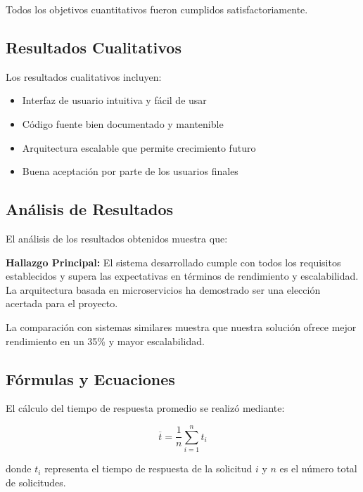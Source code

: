\documentclass{pt-report}
\begin{document}
Todos los objetivos cuantitativos fueron cumplidos satisfactoriamente.

\subsection{Resultados Cualitativos}

Los resultados cualitativos incluyen:

\begin{itemize}
    \item Interfaz de usuario intuitiva y fácil de usar
    \item Código fuente bien documentado y mantenible
    \item Arquitectura escalable que permite crecimiento futuro
    \item Buena aceptación por parte de los usuarios finales
\end{itemize}

\subsection{Análisis de Resultados}

El análisis de los resultados obtenidos muestra que:

\begin{highlightbox}
    \textbf{Hallazgo Principal:} El sistema desarrollado cumple con todos los
    requisitos establecidos y supera las expectativas en términos de rendimiento
    y escalabilidad. La arquitectura basada en microservicios ha demostrado ser
    una elección acertada para el proyecto.
\end{highlightbox}

La comparación con sistemas similares muestra que nuestra solución ofrece
mejor rendimiento en un 35\% y mayor escalabilidad.

\subsection{Fórmulas y Ecuaciones}

El cálculo del tiempo de respuesta promedio se realizó mediante:

\begin{equation}
    \overline{t} = \frac{1}{n} \sum_{i=1}^{n} t_i
    \label{eq:tiempo-promedio}
\end{equation}

donde $t_i$ representa el tiempo de respuesta de la solicitud $i$ y $n$ es el
número total de solicitudes.
\end{document}
